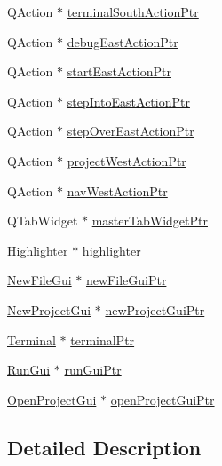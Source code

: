 \begin{DoxyCompactItemize}
\item 
Q\-Action $\ast$ \hyperlink{class_master_actions_ad96c9f17230e162e9a9f39a867101a53}{terminal\-South\-Action\-Ptr}
\item 
Q\-Action $\ast$ \hyperlink{class_master_actions_ab26f3e610cb9e303ac3a987964dfac19}{debug\-East\-Action\-Ptr}
\item 
Q\-Action $\ast$ \hyperlink{class_master_actions_a8ea0090704403ea15decad4e0104feb8}{start\-East\-Action\-Ptr}
\item 
Q\-Action $\ast$ \hyperlink{class_master_actions_acc473f35c8ee83c1d2d10d3a73522461}{step\-Into\-East\-Action\-Ptr}
\item 
Q\-Action $\ast$ \hyperlink{class_master_actions_a2c51444dbd1ff60d23dd52cc6fb4a9f7}{step\-Over\-East\-Action\-Ptr}
\item 
Q\-Action $\ast$ \hyperlink{class_master_actions_aa4160469d2e9a840448c49e95bcfa9e5}{project\-West\-Action\-Ptr}
\item 
Q\-Action $\ast$ \hyperlink{class_master_actions_af1e3c333e90f4763dfd964aa2321b034}{nav\-West\-Action\-Ptr}
\item 
Q\-Tab\-Widget $\ast$ \hyperlink{class_master_actions_a774ef398053050c37d62b7a24e61c7ee}{master\-Tab\-Widget\-Ptr}
\item 
\hyperlink{class_highlighter}{Highlighter} $\ast$ \hyperlink{class_master_actions_a50b1565db8b7780ec4e88e59953aa67b}{highlighter}
\item 
\hyperlink{class_new_file_gui}{New\-File\-Gui} $\ast$ \hyperlink{class_master_actions_a8839c174acf071c0d9bfe450160218eb}{new\-File\-Gui\-Ptr}
\item 
\hyperlink{class_new_project_gui}{New\-Project\-Gui} $\ast$ \hyperlink{class_master_actions_a78733336a3d5fd3bbb55eaf0215f0d40}{new\-Project\-Gui\-Ptr}
\item 
\hyperlink{class_terminal}{Terminal} $\ast$ \hyperlink{class_master_actions_accb886e749ad46cb6373187e59921bcf}{terminal\-Ptr}
\item 
\hyperlink{class_run_gui}{Run\-Gui} $\ast$ \hyperlink{class_master_actions_ad7ff295f2e3067697e290afc4f0fd0df}{run\-Gui\-Ptr}
\item 
\hyperlink{class_open_project_gui}{Open\-Project\-Gui} $\ast$ \hyperlink{class_master_actions_a6caf7325dd9cb26f72c81a8c877db634}{open\-Project\-Gui\-Ptr}
\end{DoxyCompactItemize}


\subsection{Detailed Description}


